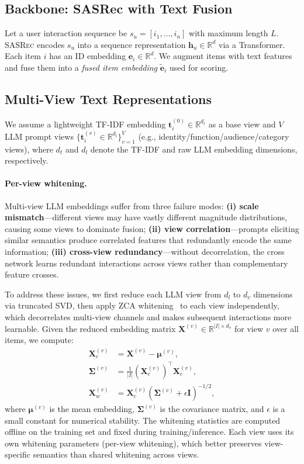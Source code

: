 \documentclass[sigconf,natbib=true,anonymous]{acmart}
\newcommand{\base}{\textsc{SASRec}\xspace}
\newcommand{\tfidf}{\textsc{TF-IDF}\xspace}
\newcommand{\llm}{\textsc{LLM}\xspace}
\begin{document}
\subsection{Backbone: SASRec with Text Fusion}
Let a user interaction sequence be $s_u = [i_1,\dots,i_n]$
with maximum length $L$. \base encodes $s_u$ into a sequence
representation $\mathbf{h}_u \in \mathbb{R}^d$ via a
Transformer. Each item $i$ has an ID embedding
$\mathbf{e}_i \in \mathbb{R}^d$. We augment items with text
features and fuse them into a \emph{fused item embedding}
$\tilde{\mathbf{e}}_i$ used for scoring.

\subsection{Multi-View Text Representations}\label{sec:whiten}
We assume a lightweight \tfidf embedding $\mathbf{t}_i^{(0)} \in \mathbb{R}^{d_t}$
as a base view and $V$ \llm prompt views
$\{\mathbf{t}_i^{(v)} \in \mathbb{R}^{d_l}\}_{v=1}^V$ (e.g.,
identity/function/audience/category views), where $d_t$ and $d_l$ denote the
\tfidf and raw \llm embedding dimensions, respectively.

\paragraph{Per-view whitening.}
Multi-view \llm embeddings suffer from three failure modes:
\textbf{(i) scale mismatch}---different views may have vastly
different magnitude distributions, causing some views to
dominate fusion; \textbf{(ii) view correlation}---prompts
eliciting similar semantics produce correlated features that
redundantly encode the same information; \textbf{(iii)
cross-view redundancy}---without decorrelation, the cross
network learns redundant interactions across views rather than
complementary feature crosses.

To address these issues, we first reduce each \llm view from $d_l$ to $d_v$
dimensions via truncated SVD, then apply ZCA whitening~\cite{kessy2018zca} to each view
independently, which decorrelates multi-view channels and makes
subsequent interactions more learnable.
Given the reduced embedding matrix $\mathbf{X}^{(v)} \in \mathbb{R}^{|I| \times d_v}$
for view $v$ over all items, we compute:
\begin{align}
  \mathbf{X}_c^{(v)} &= \mathbf{X}^{(v)} - \boldsymbol{\mu}^{(v)}, \\
  \boldsymbol{\Sigma}^{(v)} &= \frac{1}{|I|}(\mathbf{X}_c^{(v)})^\top \mathbf{X}_c^{(v)}, \\
  \mathbf{X}_w^{(v)} &= \mathbf{X}_c^{(v)} (\boldsymbol{\Sigma}^{(v)} + \epsilon \mathbf{I})^{-1/2},
\end{align}
where $\boldsymbol{\mu}^{(v)}$ is the mean embedding, $\boldsymbol{\Sigma}^{(v)}$
is the covariance matrix, and $\epsilon$ is a small constant for numerical
stability. The whitening statistics are computed offline on the training set
and fixed during training/inference. Each view uses its own whitening
parameters (per-view whitening), which better preserves view-specific
semantics than shared whitening across views.
\end{document}

